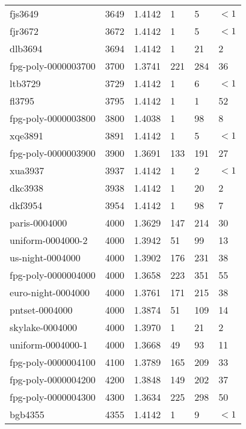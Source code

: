 \begin{longtable}{|lrrlll|}
fjs3649 & 3649 & \num{1.4142} & \num{1} & \num{5} & $<1$ \\
fjr3672 & 3672 & \num{1.4142} & \num{1} & \num{5} & $<1$ \\
dlb3694 & 3694 & \num{1.4142} & \num{1} & \num{21} & \num{2} \\
fpg-poly-0000003700 & 3700 & \num{1.3741} & \num{221} & \num{284} & \num{36} \\
ltb3729 & 3729 & \num{1.4142} & \num{1} & \num{6} & $<1$ \\
fl3795 & 3795 & \num{1.4142} & \num{1} & \num{1} & \num{52} \\
fpg-poly-0000003800 & 3800 & \num{1.4038} & \num{1} & \num{98} & \num{8} \\
xqe3891 & 3891 & \num{1.4142} & \num{1} & \num{5} & $<1$ \\
fpg-poly-0000003900 & 3900 & \num{1.3691} & \num{133} & \num{191} & \num{27} \\
xua3937 & 3937 & \num{1.4142} & \num{1} & \num{2} & $<1$ \\
dkc3938 & 3938 & \num{1.4142} & \num{1} & \num{20} & \num{2} \\
dkf3954 & 3954 & \num{1.4142} & \num{1} & \num{98} & \num{7} \\
paris-0004000 & 4000 & \num{1.3629} & \num{147} & \num{214} & \num{30} \\
uniform-0004000-2 & 4000 & \num{1.3942} & \num{51} & \num{99} & \num{13} \\
us-night-0004000 & 4000 & \num{1.3902} & \num{176} & \num{231} & \num{38} \\
fpg-poly-0000004000 & 4000 & \num{1.3658} & \num{223} & \num{351} & \num{55} \\
euro-night-0004000 & 4000 & \num{1.3761} & \num{171} & \num{215} & \num{38} \\
pntset-0004000 & 4000 & \num{1.3874} & \num{51} & \num{109} & \num{14} \\
skylake-0004000 & 4000 & \num{1.3970} & \num{1} & \num{21} & \num{2} \\
uniform-0004000-1 & 4000 & \num{1.3668} & \num{49} & \num{93} & \num{11} \\
fpg-poly-0000004100 & 4100 & \num{1.3789} & \num{165} & \num{209} & \num{33} \\
fpg-poly-0000004200 & 4200 & \num{1.3848} & \num{149} & \num{202} & \num{37} \\
fpg-poly-0000004300 & 4300 & \num{1.3634} & \num{225} & \num{298} & \num{50} \\
bgb4355 & 4355 & \num{1.4142} & \num{1} & \num{9} & $<1$ \\

\end{longtable}
